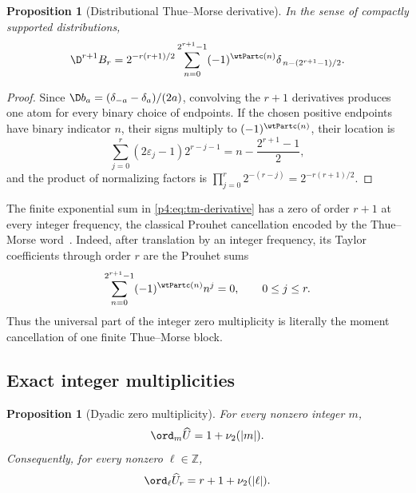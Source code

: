 \documentclass[11pt]{article}
\numberwithin{equation}{section}
\newtheorem{proposition}[theorem]{Proposition}
\theoremstyle{definition}
\theoremstyle{remark}
\newcommand{\Z}{\mathbb Z}
\begin{document}
\begin{proposition}[Distributional Thue--Morse derivative]
\label{p4:prop:tm-derivative}
In the sense of compactly supported distributions,
\begin{equation}
 \D^{r+1}B_r
 =2^{-r(r+1)/2}
 \sum_{n=0}^{2^{r+1}-1}
 (-1)^{\wtPartc(n)}
 \delta_{\,n-(2^{r+1}-1)/2}.
 \label{p4:eq:tm-derivative}
\end{equation}
\end{proposition}

\begin{proof}
Since
$\D b_a=(\delta_{-a}-\delta_a)/(2a)$, convolving the $r+1$ derivatives produces one atom for every binary choice of endpoints.  If the chosen positive endpoints have binary indicator $n$, their signs multiply to $(-1)^{\wtPartc(n)}$, their location is
\[
 \sum_{j=0}^{r}(2\varepsilon_j-1)2^{r-j-1}
 =n-\frac{2^{r+1}-1}{2},
\]
and the product of normalizing factors is
$\prod_{j=0}^{r}2^{-(r-j)}=2^{-r(r+1)/2}$.
\end{proof}

The finite exponential sum in \eqref{p4:eq:tm-derivative} has a zero of order $r+1$ at every integer frequency, the classical Prouhet cancellation encoded by the Thue--Morse word~\cite{p4:prouhet,p4:alloucheShallit}.  Indeed, after translation by an integer frequency, its Taylor coefficients through order $r$ are the Prouhet sums
\begin{equation}
 \sum_{n=0}^{2^{r+1}-1}(-1)^{\wtPartc(n)}n^j=0,
 \qquad 0\le j\le r.
 \label{p4:eq:prouhet}
\end{equation}
Thus the universal part of the integer zero multiplicity is literally the moment cancellation of one finite Thue--Morse block.

\subsection{Exact integer multiplicities}
\begin{proposition}[Dyadic zero multiplicity]
\label{p4:prop:zero-multiplicity}
For every nonzero integer $m$,
\begin{equation}
 \ord_m\widehat U=1+\nu_2(|m|).
 \label{p4:eq:zero-multiplicity}
\end{equation}
Consequently, for every nonzero $\ell\in\Z$,
\begin{equation}
 \ord_\ell\widehat U_r=r+1+\nu_2(|\ell|).
 \label{p4:eq:scaled-zero-multiplicity}
\end{equation}
\end{proposition}
\end{document}

